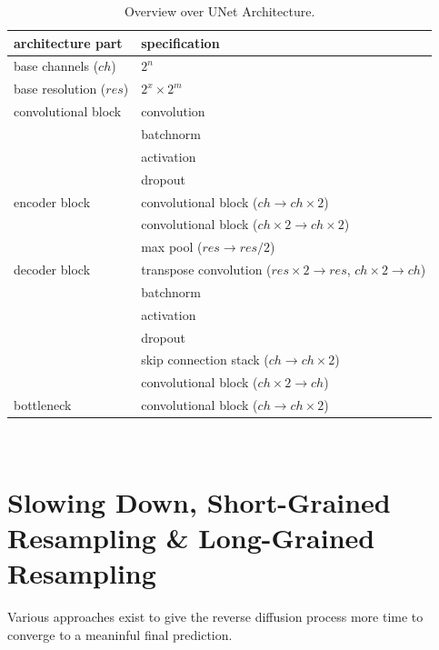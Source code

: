 \begin{table}
    \centering
    \caption[Overview over UNet Architecture]{Overview over UNet Architecture.}
    \label{tab:unetlayers}
    \begin{tabular}{l l}
        \textbf{architecture part}     & \textbf{specification}                                                            \\
        \hline\hline
        base channels ($ch$)           & $2^n$                                                                             \\
        \hline base resolution ($res$) & $2^x \times 2^m$                                                                  \\ \hline
        convolutional block            & convolution                                                                       \\ & batchnorm\\ & activation\\ & dropout                         \\
        \hline encoder block           & convolutional block ($ch \rightarrow ch\times 2$)                                 \\ & convolutional block ($ch\times 2 \rightarrow ch\times 2$) \\ & max pool ($res\rightarrow res/ 2$) \\
        \hline decoder block           & transpose convolution ($res\times 2\rightarrow res$, $ch\times 2 \rightarrow ch$) \\ & batchnorm\\ & activation\\ & dropout \\ & skip connection stack ($ch \rightarrow ch\times 2$) \\ & convolutional block ($ch\times 2 \rightarrow ch$)\\
        \hline bottleneck              & convolutional block ($ch \rightarrow ch\times 2$)
    \end{tabular}
\end{table}

\begin{figure}
    \centering
    \
\end{figure}

\section{Slowing Down, Short-Grained Resampling \& Long-Grained Resampling}
Various approaches exist to give the reverse diffusion process more time to converge to a meaninful final prediction.

